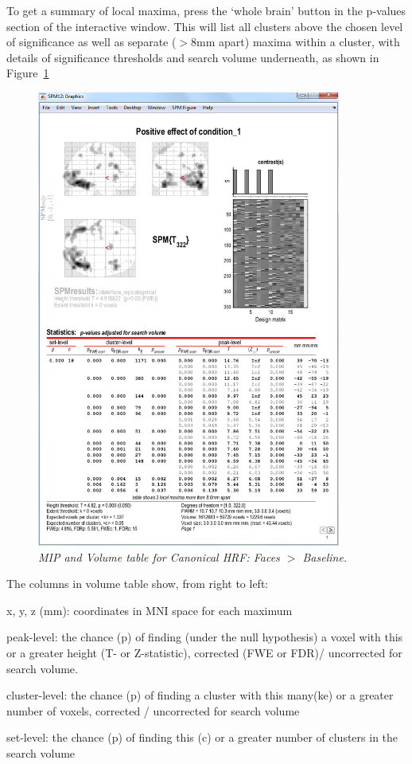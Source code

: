 To get a summary of local maxima, press the `whole brain' button in the 
p-values section of the interactive window. This will list all clusters above the chosen level of significance as well as separate ($>$8mm apart) maxima within a cluster, with details of significance thresholds and search volume underneath, as shown in Figure~\ref{cat5_volume}
\begin{figure}
\begin{center}
\includegraphics[width=100mm]{faces/cat5_volume}
\caption{\em MIP and Volume table for Canonical HRF: Faces  $>$ Baseline. \label{cat5_volume} }
\end{center}
\end{figure}
The columns in volume table show, from right to left:
\bi
\item{x, y, z (mm): coordinates in MNI space for each maximum}
\item{peak-level: the chance (p) of finding (under the null hypothesis) a voxel with this or a greater height (T- or Z-statistic), corrected (FWE or FDR)/ uncorrected for search volume.}
\item{cluster-level: the chance (p) of finding a cluster with this many(ke) or a greater number of voxels, corrected / uncorrected for search volume}
\item{set-level: the chance (p) of finding this (c) or a greater number of clusters in the search volume}
\ei

